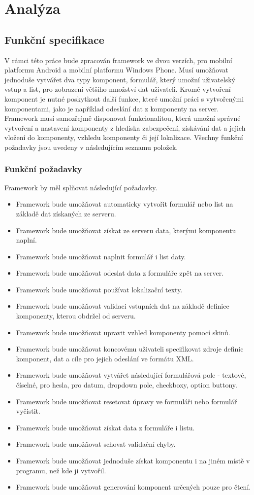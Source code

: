 \chapter{Analýza}
\section{Funkční specifikace}
V rámci této práce bude zpracován framework ve dvou verzích, pro mobilní platformu Android a mobilní platformu Windows Phone. Musí umožňovat jednoduše vytvářet dva typy komponent, formulář, který umožní uživatelský vstup a list, pro zobrazení většího množství dat uživateli. Kromě vytvoření komponent je nutné poskytkout další funkce, které umožní práci s vytvořenými komponentami, jako je například odeslání dat z komponenty na server. Framework musí samozřejmě disponovat funkcionalitou, která umožní správné vytvoření a nastavení komponenty z hlediska zabezpečení, získávání dat a jejich vložení do komponenty, vzhledu komponenty či její lokalizace. Všechny funkční požadavky jsou uvedeny v následujícím seznamu položek.
\subsection{Funkční požadavky}

Framework by měl splňovat následující požadavky.
\begin{itemize}
\item Framework bude umožňovat automaticky vytvořit formulář nebo list na základě dat získaných ze serveru.
\item Framework bude umožňovat získat ze serveru data, kterými komponentu naplní.
\item Framework bude umožňovat naplnit formulář i list daty.
\item Framework bude umožňovat odeslat data z formuláře zpět na server.
\item Framework bude umožňovat používat lokalizační texty.
\item Framework bude umožňovat validaci vstupních dat na základě definice komponenty, kterou obdržel od serveru.
\item Framework bude umožňovat upravit vzhled komponenty pomocí skinů.
\item Framework bude umožňovat koncovému uživateli specifikovat zdroje definic komponent, dat a cíle pro jejich odeslání ve formátu XML.
\item Framework bude umožňovat vytvářet následující formulářová pole - textové, číselné, pro hesla, pro datum, dropdown pole, checkboxy, option buttony.
\item Framework bude umožňovat resetovat úpravy ve formuláři nebo formulář vyčistit.
\item Framework bude umožňovat získat data z formuláře i listu.
\item Framework bude umožňovat schovat validační chyby.
\item Framework bude umožňovat jednoduše získat komponentu i na jiném místě v programu, než kde ji vytvořil.
\item Framework bude umožňovat generování komponent určených pouze pro čtení. 
\end{itemize}

